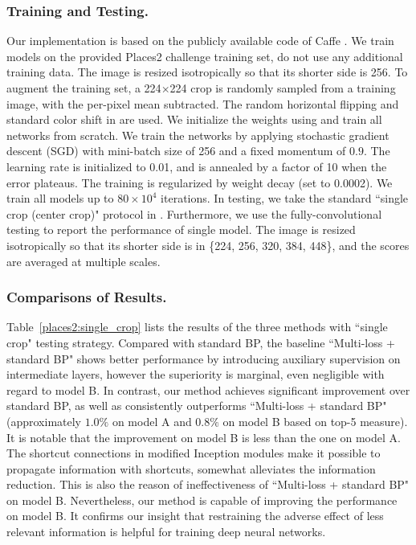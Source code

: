 \documentclass[runningheads]{llncs}
\begin{document}
\subsubsection{Training and Testing.} Our implementation is based on the publicly available code of Caffe \cite{jia2014_caffe}. We train models on the provided Places2 challenge training set, do not use any additional training data. The image is resized isotropically so that its shorter side is 256. To augment the training set, a 224$\times$224 crop is randomly sampled from a training image, with the per-pixel mean subtracted. The random horizontal flipping and standard color shift in \cite{krizhevsky_nips2012} are used. We initialize the weights using \cite{he_iccv2015} and train all networks from scratch. We train the networks by applying stochastic gradient descent (SGD) with mini-batch size of 256 and a fixed momentum of $0.9$. The learning rate is initialized to 0.01, and is annealed by a factor of 10 when the error plateaus.
The training is regularized by weight decay (set to 0.0002). We train all models up to $80\times10^4$ iterations. In testing, we take the standard ``single crop (center crop)" protocol in \cite{szegedy_cvpr2015}. Furthermore, we use the fully-convolutional testing \cite{simonyan_iclr2015} to report the performance of single model. The image is resized isotropically so that its shorter side is in \{224, 256, 320, 384, 448\}, and the scores are averaged at multiple scales.



\subsubsection{Comparisons of Results.} Table~\ref{places2:single_crop} lists the results of the three methods with ``single crop" testing strategy. Compared with standard BP, the baseline ``Multi-loss + standard BP" shows better performance by introducing auxiliary supervision on intermediate layers, however the superiority is marginal, even negligible with regard to model B. In contrast, our method achieves significant improvement over standard BP, as well as consistently outperforms ``Multi-loss + standard BP" (approximately $1.0\%$ on model A and $0.8\%$ on model B based on top-5 measure). It is notable that the improvement on model B is less than the one on model A. The shortcut connections in modified Inception modules make it possible to propagate information with shortcuts, somewhat alleviates the information reduction. This is also the reason of ineffectiveness of ``Multi-loss + standard BP" on model B. Nevertheless, our method is capable of improving the performance on model B. It confirms our insight that restraining the adverse effect of less relevant information is helpful for training deep neural networks.
\end{document}
